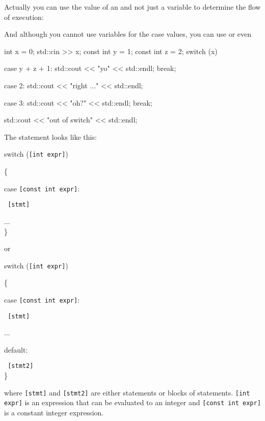 Actually you can use the value of an  and not
just a variable to determine the flow of execution:

And although you cannot use variables for the case values, you can use
 or even 

\begin{console}[commandchars=\~\@\$]
int x = 0;
std::cin >> x;
const int y = 1;
const int z = 2;
switch (x)
{
        case y + z + 1:
             std::cout << "yo" << std::endl;
             break;
        
        case 2:
             std::cout << "right ..." << std::endl;

        case 3:
             std::cout << "oh?" << std::endl;
             break;
}
std::cout << "out of switch" << std::endl;
\end{console}

\newpage{}

The statement looks like this:

switch (\texttt{{[}int expr{]}})

\{

case \texttt{{[}const int expr{]}}:

\texttt{ {[}stmt{]}}

...\\
\}

or

switch (\texttt{{[}int expr{]}})

\{

case \texttt{{[}const int expr{]}}:

\texttt{ {[}stmt{]}}

...

default:

\texttt{ {[}stmt2{]}}\\
\}

where \texttt{{[}stmt{]}} and \texttt{{[}stmt2{]}} are either statements or
blocks of statements. \texttt{{[}int expr{]}} is an expression that can be
evaluated to an integer and \texttt{{[}const int expr{]}} is a constant
integer expression.

